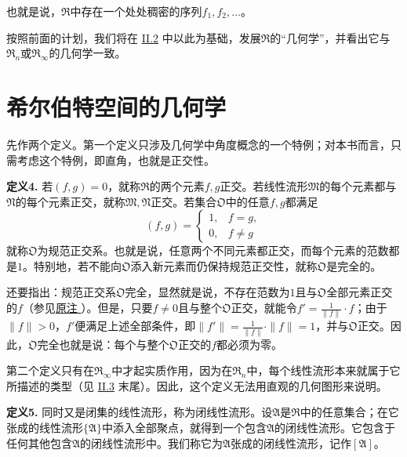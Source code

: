 \documentclass[fontsize=13pt,twoside,openany,headings=normal,parskip=false,bookmarkpackage=false,DIV=calc]{scrbook}
\begin{document}
也就是说，$\mathfrak{R}$中存在一个处处稠密的序列$f_1,\allowbreak f_2,\allowbreak \ldots$。

按照前面的计划，我们将在 \hyperref[sec:II.2]{II.2} 中以此为基础，发展$\mathfrak{R}$的“几何学”，并看出它与$\mathfrak{R}_n$或$\mathfrak{R}_\infty$的几何学一致。

\section{希尔伯特空间的几何学}\label{sec:II.2}

先作两个定义。第一个定义只涉及几何学中角度概念的一个特例；对本书而言，只需考虑这个特例，即直角，也就是正交性。

\leavevmode{}\textbf{定义4.}\label{def:II.4} 若$(f,\allowbreak g)=0$，就称$\mathfrak{R}$的两个元素$f,\allowbreak g$正交。若线性流形$\mathfrak{M}$的每个元素都与$\mathfrak{N}$的每个元素正交，就称$\mathfrak{M},\allowbreak \mathfrak{N}$正交。若集合$\mathfrak{O}$中的任意$f,\allowbreak g$都满足
\[
(f,g)=\begin{cases}1,&f=g,\\0,&f\ne g\end{cases}
\]\hypertarget{origpage-25}{}\label{origpage-25}就称$\mathfrak{O}$为规范正交系。也就是说，任意两个不同元素都正交，而每个元素的范数都是$1$。特别地，若不能向$\mathfrak{O}$添入新元素而仍保持规范正交性，就称$\mathfrak{O}$是完全的。

还要指出：规范正交系$\mathfrak{O}$完全，显然就是说，不存在范数为$1$且与$\mathfrak{O}$全部元素正交的$f$（参见\CJKglue \hyperlink{note-46}{原注 }）。但是，只要$f\ne0$且与整个$\mathfrak{O}$正交，就能令$f'=\frac1{\|f\|}\cdot f$；由于$\|f\|>0$，$f'$便满足上述全部条件，即$\|f'\|=\frac1{\|f\|}\cdot\|f\|=1$，并与$\mathfrak{O}$正交。因此，$\mathfrak{O}$完全也就是说：每个与整个$\mathfrak{O}$正交的$f$都必须为零。

第二个定义只有在$\mathfrak{R}_\infty$中才起实质作用，因为在$\mathfrak{R}_n$中，每个线性流形本来就属于它所描述的类型（见 \hyperref[sec:II.3]{II.3} 末尾）。因此，这个定义无法用直观的几何图形来说明。

\leavevmode{}\textbf{定义5.}\label{def:II.5} 同时又是闭集的线性流形，称为闭线性流形。设$\mathfrak{A}$是$\mathfrak{R}$中的任意集合；在它张成的线性流形$\{\mathfrak{A}\}$中添入全部聚点，就得到一个包含$\mathfrak{A}$的闭线性流形。它包含于任何其他包含$\mathfrak{A}$的闭线性流形中。我们称它为$\mathfrak{A}$张成的闭线性流形，记作$[\mathfrak{A}]$。
\end{document}
